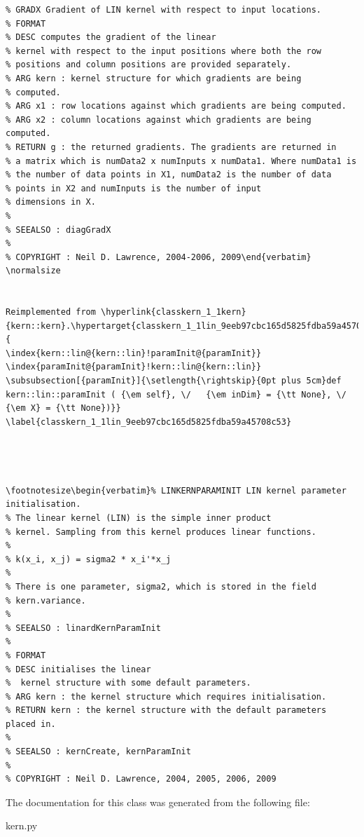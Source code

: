 \footnotesize\begin{verbatim}% GRADX Gradient of LIN kernel with respect to input locations.
% FORMAT
% DESC computes the gradient of the linear
% kernel with respect to the input positions where both the row
% positions and column positions are provided separately.
% ARG kern : kernel structure for which gradients are being
% computed.
% ARG x1 : row locations against which gradients are being computed.
% ARG x2 : column locations against which gradients are being computed.
% RETURN g : the returned gradients. The gradients are returned in
% a matrix which is numData2 x numInputs x numData1. Where numData1 is
% the number of data points in X1, numData2 is the number of data
% points in X2 and numInputs is the number of input
% dimensions in X.
%
% SEEALSO : diagGradX
%
% COPYRIGHT : Neil D. Lawrence, 2004-2006, 2009\end{verbatim}
\normalsize
 

Reimplemented from \hyperlink{classkern_1_1kern}{kern::kern}.\hypertarget{classkern_1_1lin_9eeb97cbc165d5825fdba59a45708c53}{
\index{kern::lin@{kern::lin}!paramInit@{paramInit}}
\index{paramInit@{paramInit}!kern::lin@{kern::lin}}
\subsubsection[{paramInit}]{\setlength{\rightskip}{0pt plus 5cm}def kern::lin::paramInit ( {\em self}, \/   {\em inDim} = {\tt None}, \/   {\em X} = {\tt None})}}
\label{classkern_1_1lin_9eeb97cbc165d5825fdba59a45708c53}




\footnotesize\begin{verbatim}% LINKERNPARAMINIT LIN kernel parameter initialisation.
% The linear kernel (LIN) is the simple inner product
% kernel. Sampling from this kernel produces linear functions.
%
% k(x_i, x_j) = sigma2 * x_i'*x_j
%
% There is one parameter, sigma2, which is stored in the field
% kern.variance.
%
% SEEALSO : linardKernParamInit
%
% FORMAT
% DESC initialises the linear
%  kernel structure with some default parameters.
% ARG kern : the kernel structure which requires initialisation.
% RETURN kern : the kernel structure with the default parameters placed in.
%
% SEEALSO : kernCreate, kernParamInit
%
% COPYRIGHT : Neil D. Lawrence, 2004, 2005, 2006, 2009

\end{verbatim}
\normalsize
 

The documentation for this class was generated from the following file:\begin{CompactItemize}
\item 
kern.py\end{CompactItemize}

